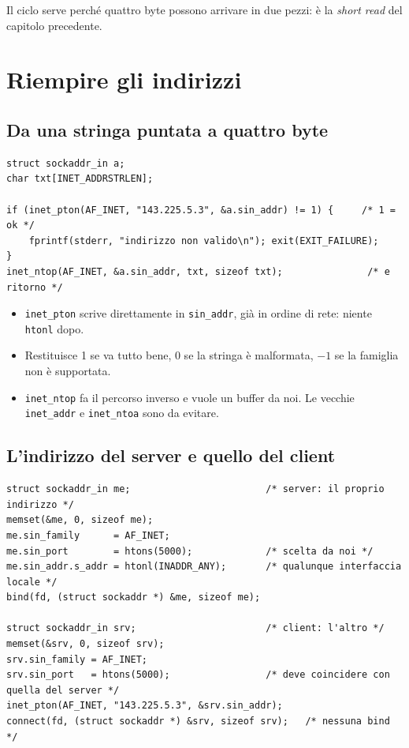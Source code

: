 Il ciclo serve perché quattro byte possono arrivare in due pezzi: è la \emph{short read} del capitolo precedente.

\section{Riempire gli indirizzi}

\subsection{Da una stringa puntata a quattro byte}

\begin{lstlisting}[language={[POSIX]C}]
struct sockaddr_in a;
char txt[INET_ADDRSTRLEN];

if (inet_pton(AF_INET, "143.225.5.3", &a.sin_addr) != 1) {     /* 1 = ok */
    fprintf(stderr, "indirizzo non valido\n"); exit(EXIT_FAILURE);
}
inet_ntop(AF_INET, &a.sin_addr, txt, sizeof txt);               /* e ritorno */
\end{lstlisting}

\begin{itemize}
    \item \texttt{inet\_pton} scrive direttamente in \texttt{sin\_addr}, già in ordine di rete: niente \texttt{htonl} dopo.
    \item Restituisce 1 se va tutto bene, 0 se la stringa è malformata, $-1$ se la famiglia non è supportata.
    \item \texttt{inet\_ntop} fa il percorso inverso e vuole un buffer da noi. Le vecchie \texttt{inet\_addr} e
          \texttt{inet\_ntoa} sono da evitare.
\end{itemize}

\subsection{L'indirizzo del server e quello del client}

\begin{lstlisting}[language={[POSIX]C}, style=wnumbers, title={La stessa struttura, due significati}]
struct sockaddr_in me;                        /* server: il proprio indirizzo */
memset(&me, 0, sizeof me);
me.sin_family      = AF_INET;
me.sin_port        = htons(5000);             /* scelta da noi */
me.sin_addr.s_addr = htonl(INADDR_ANY);       /* qualunque interfaccia locale */
bind(fd, (struct sockaddr *) &me, sizeof me);

struct sockaddr_in srv;                       /* client: l'altro */
memset(&srv, 0, sizeof srv);
srv.sin_family = AF_INET;
srv.sin_port   = htons(5000);                 /* deve coincidere con quella del server */
inet_pton(AF_INET, "143.225.5.3", &srv.sin_addr);
connect(fd, (struct sockaddr *) &srv, sizeof srv);   /* nessuna bind */
\end{lstlisting}

